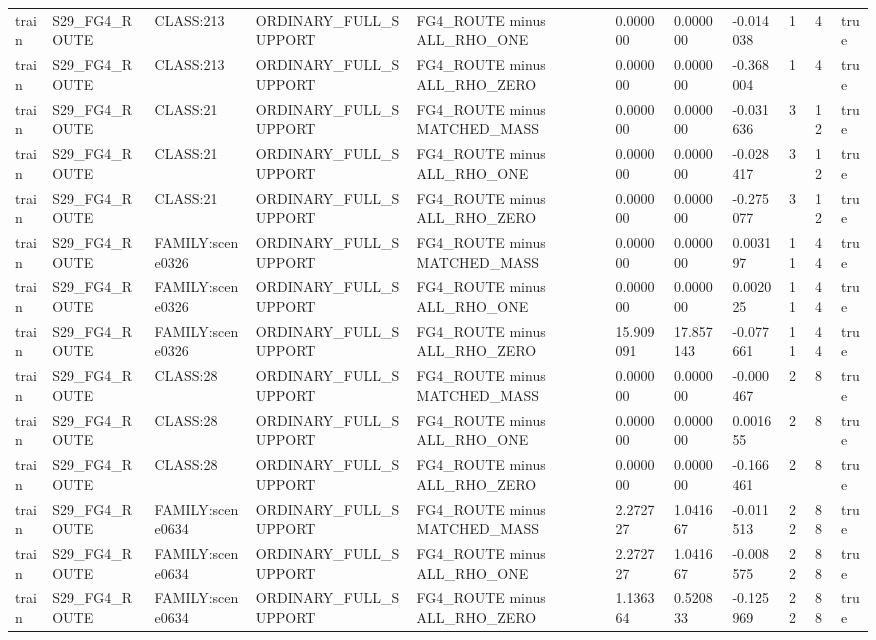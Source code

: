 \begin{tabular}{lllllllllll}
train & S29\_FG4\_ROUTE & CLASS:213 & ORDINARY\_FULL\_SUPPORT & FG4\_ROUTE minus ALL\_RHO\_ONE & 0.000000 & 0.000000 & -0.014038 & 1 & 4 & true \\
train & S29\_FG4\_ROUTE & CLASS:213 & ORDINARY\_FULL\_SUPPORT & FG4\_ROUTE minus ALL\_RHO\_ZERO & 0.000000 & 0.000000 & -0.368004 & 1 & 4 & true \\
train & S29\_FG4\_ROUTE & CLASS:21 & ORDINARY\_FULL\_SUPPORT & FG4\_ROUTE minus MATCHED\_MASS & 0.000000 & 0.000000 & -0.031636 & 3 & 12 & true \\
train & S29\_FG4\_ROUTE & CLASS:21 & ORDINARY\_FULL\_SUPPORT & FG4\_ROUTE minus ALL\_RHO\_ONE & 0.000000 & 0.000000 & -0.028417 & 3 & 12 & true \\
train & S29\_FG4\_ROUTE & CLASS:21 & ORDINARY\_FULL\_SUPPORT & FG4\_ROUTE minus ALL\_RHO\_ZERO & 0.000000 & 0.000000 & -0.275077 & 3 & 12 & true \\
train & S29\_FG4\_ROUTE & FAMILY:scene0326 & ORDINARY\_FULL\_SUPPORT & FG4\_ROUTE minus MATCHED\_MASS & 0.000000 & 0.000000 & 0.003197 & 11 & 44 & true \\
train & S29\_FG4\_ROUTE & FAMILY:scene0326 & ORDINARY\_FULL\_SUPPORT & FG4\_ROUTE minus ALL\_RHO\_ONE & 0.000000 & 0.000000 & 0.002025 & 11 & 44 & true \\
train & S29\_FG4\_ROUTE & FAMILY:scene0326 & ORDINARY\_FULL\_SUPPORT & FG4\_ROUTE minus ALL\_RHO\_ZERO & 15.909091 & 17.857143 & -0.077661 & 11 & 44 & true \\
train & S29\_FG4\_ROUTE & CLASS:28 & ORDINARY\_FULL\_SUPPORT & FG4\_ROUTE minus MATCHED\_MASS & 0.000000 & 0.000000 & -0.000467 & 2 & 8 & true \\
train & S29\_FG4\_ROUTE & CLASS:28 & ORDINARY\_FULL\_SUPPORT & FG4\_ROUTE minus ALL\_RHO\_ONE & 0.000000 & 0.000000 & 0.001655 & 2 & 8 & true \\
train & S29\_FG4\_ROUTE & CLASS:28 & ORDINARY\_FULL\_SUPPORT & FG4\_ROUTE minus ALL\_RHO\_ZERO & 0.000000 & 0.000000 & -0.166461 & 2 & 8 & true \\
train & S29\_FG4\_ROUTE & FAMILY:scene0634 & ORDINARY\_FULL\_SUPPORT & FG4\_ROUTE minus MATCHED\_MASS & 2.272727 & 1.041667 & -0.011513 & 22 & 88 & true \\
train & S29\_FG4\_ROUTE & FAMILY:scene0634 & ORDINARY\_FULL\_SUPPORT & FG4\_ROUTE minus ALL\_RHO\_ONE & 2.272727 & 1.041667 & -0.008575 & 22 & 88 & true \\
train & S29\_FG4\_ROUTE & FAMILY:scene0634 & ORDINARY\_FULL\_SUPPORT & FG4\_ROUTE minus ALL\_RHO\_ZERO & 1.136364 & 0.520833 & -0.125969 & 22 & 88 & true \\

\end{tabular}
